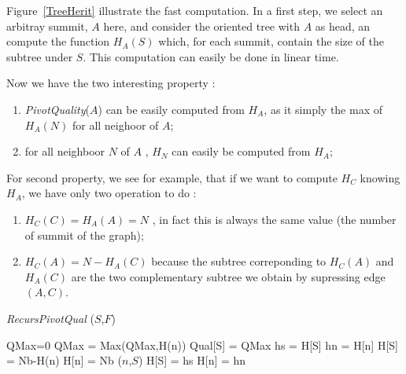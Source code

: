 \documentclass[a4paper]{article}
\begin{document}
Figure~\ref{TreeHerit} illustrate the fast computation. In a first step, we select
an arbitray summit, $A$ here, and consider the oriented tree with $A$ as head, an compute
the function $H_A(S)$ which, for each summit, contain the size of the subtree under $S$. This computation
can easily be done in linear time.

Now we have the two interesting property : 

\begin{enumerate}
  \item   \emph{PivotQuality}($A$) can be easily computed from  $H_A$, as it
          simply the max of  $H_A(N)$ for all neighoor of $A$;
  \item   for all neighboor $N$ of $A$ , $H_N$ can easily be computed from $H_A$;
\end{enumerate}

For second property, we see for example, that if we want to compute $H_C$ knowing
$H_A$, we have only two operation to do :


\begin{enumerate}
  \item   $H_C(C) = H_A(A) = N$ , in  fact this is always the same value (the number of summit of the graph);
  \item   $H_C(A) = N-H_A(C)$  because the subtree correponding to $H_C(A)$ and $H_A(C)$ are the
          two complementary subtree we obtain by supressing edge $(A,C)$.
\end{enumerate}


\begin{algorithm}
\caption{{\it RecursPivotQual} ($S$,$F$)  }
\begin{algorithmic}
     \STATE {}
     \STATE QMax=0  
              \STATE QMax = Max(QMax,H(n))
     \ENDFOR
     \STATE Qual[S] = QMax
     \STATE {}
              \STATE {}
              \STATE hs = H[S]
              \STATE hn = H[n]
              \STATE H[S] = Nb-H(n)
              \STATE H[n] = Nb
              ($n$,$S$)
              \STATE {}
              \STATE H[S] = hs
              \STATE H[n] = hn
     \ENDFOR
\end{algorithmic}
\label{AlgoRecPivot}
\end{algorithm}
\end{document}
